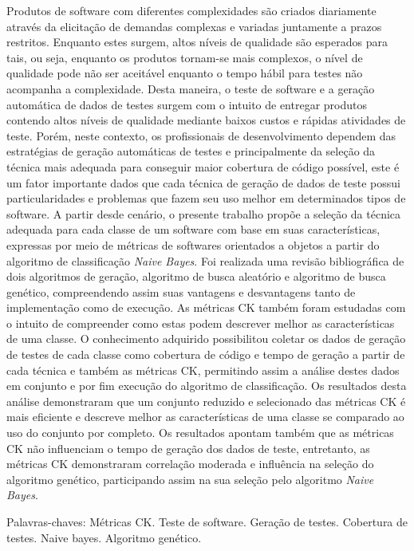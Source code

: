 \documentclass[
	12pt,				%
	oneside,			%
	a4paper,			%
	english,			%
	brazil				%
	]{abntex2ppgsi}
\begin{document}
\begin{resumo}
Produtos de software com diferentes complexidades são criados diariamente através da elicitação de demandas complexas e variadas juntamente a prazos restritos. Enquanto estes surgem, altos níveis de qualidade são esperados para tais, ou seja, enquanto os produtos tornam-se mais complexos, o nível de qualidade pode não ser aceitável enquanto o tempo hábil para testes não acompanha a complexidade. Desta maneira, o teste de software e a geração automática de dados de testes surgem com o intuito de entregar produtos contendo altos níveis de qualidade mediante baixos custos e rápidas atividades de teste. Porém, neste contexto, os profissionais de desenvolvimento dependem das estratégias de geração automáticas de testes e principalmente da seleção da técnica mais adequada para conseguir maior cobertura de código possível, este é um fator importante dados que cada técnica de geração de dados de teste possui particularidades e problemas que fazem seu uso melhor em determinados tipos de software. A partir desde cenário, o presente trabalho propõe a seleção da técnica adequada para cada classe de um software com base em suas características, expressas por meio de métricas de softwares orientados a objetos a partir do algoritmo de classificação  \textit{Naive Bayes}.
Foi realizada uma revisão bibliográfica de dois algoritmos de geração, algoritmo de busca aleatório e algoritmo de busca genético, compreendendo assim suas vantagens e desvantagens tanto de implementação como de execução. As métricas CK também foram estudadas com o intuito de compreender como estas podem descrever melhor as características de uma classe. O conhecimento adquirido possibilitou coletar os dados de geração de testes de cada classe como cobertura de código e tempo de geração a partir de cada técnica e também as métricas CK, permitindo assim a análise destes dados em conjunto e por fim execução do algoritmo de classificação. Os resultados desta análise demonstraram que um conjunto reduzido e selecionado das métricas CK é mais eficiente e descreve melhor as características de uma classe se comparado ao uso do conjunto por completo. Os resultados apontam também que as métricas CK não influenciam o tempo de geração dos dados de teste, entretanto, as métricas CK demonstraram correlação moderada e influência na seleção do algoritmo genético, participando assim na sua seleção pelo algoritmo \textit{Naive Bayes}.





Palavras-chaves: Métricas CK. Teste de software. Geração de testes. Cobertura de testes. Naive bayes. Algoritmo genético. 
\end{resumo}
\end{document}
